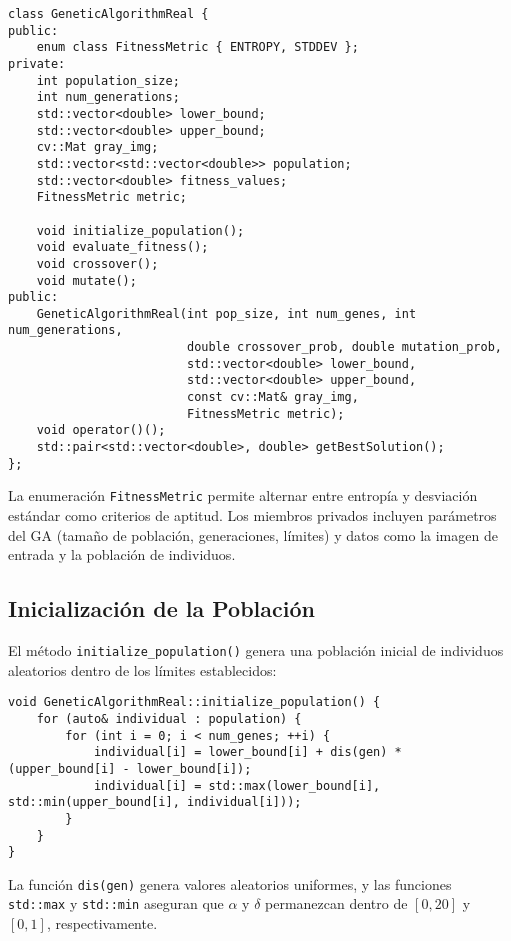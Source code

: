\begin{lstlisting}[style=cppstyle, caption={Definición de la clase en genetic\_algo\_img.h}, label={lst:ga_header}]
class GeneticAlgorithmReal {
public:
    enum class FitnessMetric { ENTROPY, STDDEV };
private:
    int population_size;
    int num_generations;
    std::vector<double> lower_bound;
    std::vector<double> upper_bound;
    cv::Mat gray_img;
    std::vector<std::vector<double>> population;
    std::vector<double> fitness_values;
    FitnessMetric metric;

    void initialize_population();
    void evaluate_fitness();
    void crossover();
    void mutate();
public:
    GeneticAlgorithmReal(int pop_size, int num_genes, int num_generations,
                         double crossover_prob, double mutation_prob,
                         std::vector<double> lower_bound,
                         std::vector<double> upper_bound,
                         const cv::Mat& gray_img,
                         FitnessMetric metric);
    void operator()();
    std::pair<std::vector<double>, double> getBestSolution();
};
\end{lstlisting}

La enumeración \texttt{FitnessMetric} permite alternar entre entropía y desviación estándar como criterios de aptitud. Los miembros privados incluyen parámetros del GA (tamaño de población, generaciones, límites) y datos como la imagen de entrada y la población de individuos.

\subsection{Inicialización de la Población}\label{subsec:inicializacion}

El método \texttt{initialize\_population()} genera una población inicial de individuos aleatorios dentro de los límites establecidos:

\begin{lstlisting}[style=cppstyle, caption={Inicialización de la población}, label={lst:init_pop}]
void GeneticAlgorithmReal::initialize_population() {
    for (auto& individual : population) {
        for (int i = 0; i < num_genes; ++i) {
            individual[i] = lower_bound[i] + dis(gen) * (upper_bound[i] - lower_bound[i]);
            individual[i] = std::max(lower_bound[i], std::min(upper_bound[i], individual[i]));
        }
    }
}
\end{lstlisting}

La función \texttt{dis(gen)} genera valores aleatorios uniformes, y las funciones \texttt{std::max} y \texttt{std::min} aseguran que \(\alpha\) y \(\delta\) permanezcan dentro de \([0, 20]\) y \([0, 1]\), respectivamente.


